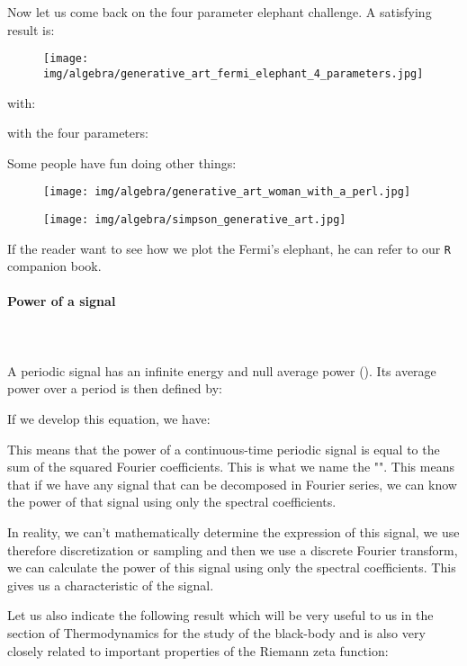 	Now let us come back on the four parameter elephant challenge. A satisfying result is:
	\begin{figure}[H]
		\centering
		\texttt{[image: img/algebra/generative\_art\_fermi\_elephant\_4\_parameters.jpg]}
	\end{figure} 
	with:
	
	with the four parameters:
	
	Some people have fun doing other things:
	\begin{figure}[H]
		\centering
		\texttt{[image: img/algebra/generative\_art\_woman\_with\_a\_perl.jpg]}
	\end{figure} 
	\begin{figure}[H]
		\centering
		\texttt{[image: img/algebra/simpson\_generative\_art.jpg]}
	\end{figure} 
	
	\begin{tcolorbox}[title=Remark,colframe=black,arc=10pt]
	If the reader want to see how we plot the Fermi's elephant, he can refer to our \texttt{R} companion book.
	\end{tcolorbox}
	
	
	\paragraph{Power of a signal}\mbox{}\\\\
	A periodic signal has an infinite energy and null average power (). Its average power over a period is then defined by:
	
	If we develop this equation, we have:
	
	This means that the power of a continuous-time periodic signal is equal to the sum of the squared Fourier coefficients. This is what we name the "\label{Parseval theorem}". This means that if we have any signal that can be decomposed in Fourier series, we can know the power of that signal using only the spectral coefficients.
	
	In reality, we can't mathematically determine the expression of this signal, we use therefore discretization or sampling and then we use a discrete Fourier transform, we can calculate the power of this signal using only the spectral coefficients. This gives us a characteristic of the signal.
	
	Let us also indicate the following result which will be very useful to us in the section of Thermodynamics for the study of the black-body and is also very closely related to important properties of the Riemann zeta function:
	
